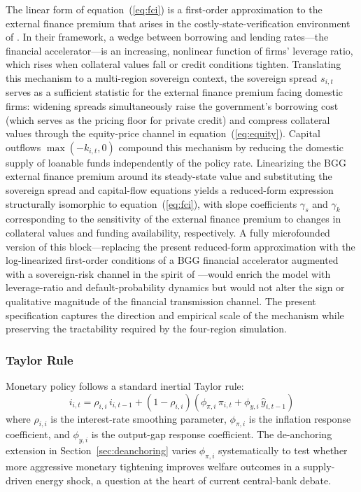 \documentclass[12pt]{article}
\begin{document}
The linear form of equation~(\ref{eq:fci}) is a first-order approximation to the external finance premium that arises in the costly-state-verification environment of \citet{bernanke1999financial}. In their framework, a wedge between borrowing and lending rates---the financial accelerator---is an increasing, nonlinear function of firms' leverage ratio, which rises when collateral values fall or credit conditions tighten. Translating this mechanism to a multi-region sovereign context, the sovereign spread $s_{i,t}$ serves as a sufficient statistic for the external finance premium facing domestic firms: widening spreads simultaneously raise the government's borrowing cost (which serves as the pricing floor for private credit) and compress collateral values through the equity-price channel in equation~(\ref{eq:equity}). Capital outflows $\max(-k_{i,t},0)$ compound this mechanism by reducing the domestic supply of loanable funds independently of the policy rate. Linearizing the BGG external finance premium around its steady-state value and substituting the sovereign spread and capital-flow equations yields a reduced-form expression structurally isomorphic to equation~(\ref{eq:fci}), with slope coefficients $\gamma_s$ and $\gamma_k$ corresponding to the sensitivity of the external finance premium to changes in collateral values and funding availability, respectively. A fully microfounded version of this block---replacing the present reduced-form approximation with the log-linearized first-order conditions of a BGG financial accelerator augmented with a sovereign-risk channel in the spirit of \citet{longstaff2011financial}---would enrich the model with leverage-ratio and default-probability dynamics but would not alter the sign or qualitative magnitude of the financial transmission channel. The present specification captures the direction and empirical scale of the mechanism while preserving the tractability required by the four-region simulation.

\subsubsection{Taylor Rule}

Monetary policy follows a standard inertial Taylor rule:
\begin{equation}
i_{i,t} = \rho_{i,i} \, i_{i,t-1} + (1 - \rho_{i,i})(\phi_{\pi,i} \, \pi_{i,t} + \phi_{y,i} \, \hat{y}_{i,t-1})
\label{eq:taylor}
\end{equation}
where $\rho_{i,i}$ is the interest-rate smoothing parameter, $\phi_{\pi,i}$ is the inflation response coefficient, and $\phi_{y,i}$ is the output-gap response coefficient. The de-anchoring extension in Section~\ref{sec:deanchoring} varies $\phi_{\pi,i}$ systematically to test whether more aggressive monetary tightening improves welfare outcomes in a supply-driven energy shock, a question at the heart of current central-bank debate.
\end{document}
